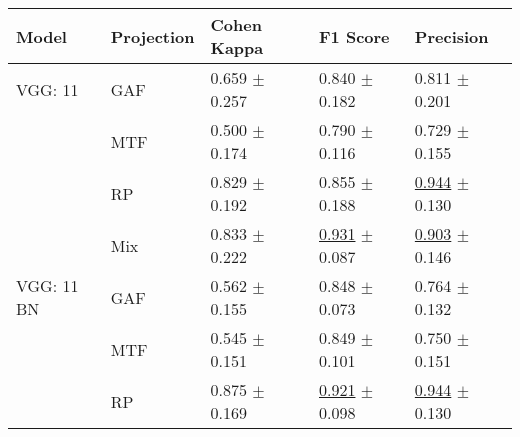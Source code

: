 
\begin{tabular}[t]{lllll}
\toprule
Model & Projection & Cohen Kappa & F1 Score & Precision \\
\midrule
VGG: 11 & GAF & \textcolor[rgb]{0.5761353517,0.4238646483,0}{0.659} $\pm$ \textcolor[rgb]{0.9813763962,0.0186236038,0}{0.257} & \textcolor[rgb]{0.6130820399,0.3869179601,0}{0.840} $\pm$ \textcolor[rgb]{0.8179931192,0.1820068808,0}{0.182} & \textcolor[rgb]{0.5967365967,0.4032634033,0}{0.811} $\pm$ \textcolor[rgb]{0.6502693890,0.3497306110,0}{0.201} \\
 & MTF & \textcolor[rgb]{0.9501335708,0.0498664292,0}{0.500} $\pm$ \textcolor[rgb]{0.6654355176,0.3345644824,0}{0.174} & \textcolor[rgb]{0.8699186992,0.1300813008,0}{0.790} $\pm$ \textcolor[rgb]{0.4021860668,0.5000000000,0}{0.116} & \textcolor[rgb]{0.8974358974,0.1025641026,0}{0.729} $\pm$ \textcolor[rgb]{0.3672049968,0.5000000000,0}{0.155} \\
 & RP & \textcolor[rgb]{0.1763134461,0.5000000000,0}{0.829} $\pm$ \textcolor[rgb]{0.7355621391,0.2644378609,0}{0.192} & \textcolor[rgb]{0.5365853659,0.4634146341,0}{0.855} $\pm$ \textcolor[rgb]{0.8554220067,0.1445779933,0}{0.188} & \underline{\textcolor[rgb]{0.1025641026,0.5000000000,0}{0.944}} $\pm$ \textcolor[rgb]{0.2080512860,0.5000000000,0}{0.130} \\
 & Mix & \textcolor[rgb]{0.1665182547,0.5000000000,0}{0.833} $\pm$ \textcolor[rgb]{0.8482671723,0.1517328277,0}{0.222} & \underline{\textcolor[rgb]{0.1463414634,0.5000000000,0}{0.931}} $\pm$ \textcolor[rgb]{0.2240040057,0.5000000000,0}{0.087} & \underline{\textcolor[rgb]{0.2564102564,0.5000000000,0}{0.903}} $\pm$ \textcolor[rgb]{0.3075839781,0.5000000000,0}{0.146} \\
VGG: 11 BN & GAF & \textcolor[rgb]{0.8032056990,0.1967943010,0}{0.562} $\pm$ \textcolor[rgb]{0.5940200153,0.4059799847,0}{0.155} & \textcolor[rgb]{0.5691056911,0.4308943089,0}{0.848} $\pm$ \textcolor[rgb]{0.1349899397,0.5000000000,0}{0.073} & \textcolor[rgb]{0.7692307692,0.2307692308,0}{0.764} $\pm$ \textcolor[rgb]{0.2230100982,0.5000000000,0}{0.132} \\
 & MTF & \textcolor[rgb]{0.8432769368,0.1567230632,0}{0.545} $\pm$ \textcolor[rgb]{0.5762840628,0.4237159372,0}{0.151} & \textcolor[rgb]{0.5650406504,0.4349593496,0}{0.849} $\pm$ \textcolor[rgb]{0.3108773772,0.5000000000,0}{0.101} & \textcolor[rgb]{0.8205128205,0.1794871795,0}{0.750} $\pm$ \textcolor[rgb]{0.3384113914,0.5000000000,0}{0.151} \\
 & RP & \textcolor[rgb]{0.0685663402,0.5000000000,0}{0.875} $\pm$ \textcolor[rgb]{0.6443051694,0.3556948306,0}{0.169} & \underline{\textcolor[rgb]{0.1951219512,0.5000000000,0}{0.921}} $\pm$ \textcolor[rgb]{0.2928051170,0.5000000000,0}{0.098} & \underline{\textcolor[rgb]{0.1025641026,0.5000000000,0}{0.944}} $\pm$ \textcolor[rgb]{0.2080512860,0.5000000000,0}{0.130} \\

\end{tabular}
